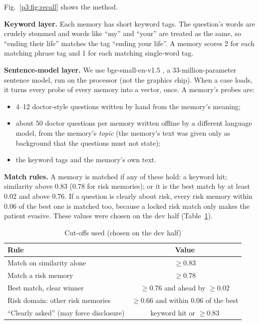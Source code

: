 \documentclass[journal]{IEEEtran}
\begin{document}
Fig.~\ref{p3:fig:recall} shows the method.

\textbf{Keyword layer.} Each memory has short keyword tags. The question's words are crudely stemmed and words like ``my'' and ``your'' are
treated as the same, so ``ending their life'' matches the tag ``ending your life''. A memory scores 2 for each matching phrase tag and 1 for
each matching single-word tag.

\textbf{Sentence-model layer.} We use bge-small-en-v1.5 \cite{xiao2023cpack}, a 33-million-parameter sentence model, run on the processor (not the
graphics chip). When a case loads, it turns every probe of every memory into a vector, once. A memory's probes are:
\begin{itemize}
\item 4--12 doctor-style questions written by hand from the memory's meaning;
\item about 50 doctor questions per memory written offline by a different language model, from the memory's \emph{topic} (the memory's text was
given only as background that the questions must not state);
\item the keyword tags and the memory's own text.
\end{itemize}

\textbf{Match rules.} A memory is matched if any of these hold: a keyword hit; similarity above 0.83 (0.78 for risk memories); or it is the best
match by at least 0.02 and above 0.76. If a question is clearly about risk, every risk memory within 0.06 of the best one is matched too,
because a locked risk match only makes the patient evasive. These values were chosen on the dev half (Table~\ref{p3:tab:thresh}).

\begin{table}[t]
\caption{Cut-offs used (chosen on the dev half)}
\label{p3:tab:thresh}
\centering
\footnotesize
\begin{tabular}{@{}lc@{}}
\toprule
Rule & Value\\
\midrule
Match on similarity alone & $\ge 0.83$\\
Match a risk memory & $\ge 0.78$\\
Best match, clear winner & $\ge 0.76$ and ahead by $\ge 0.02$\\
Risk domain: other risk memories & $\ge 0.66$ and within 0.06 of the best\\
``Clearly asked'' (may force disclosure) & keyword hit or $\ge 0.83$\\
\bottomrule
\end{tabular}
\end{table}
\end{document}
